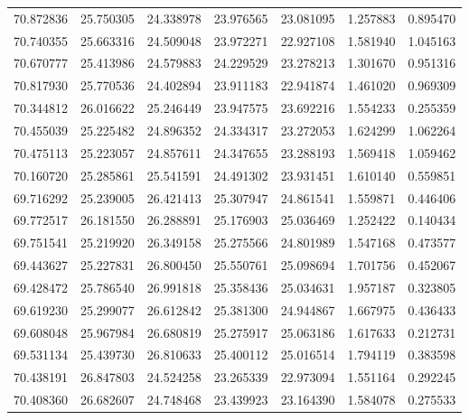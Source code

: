 \begin{tabular}{rrrrrrr}
 70.872836 &  25.750305 &         24.338978 &         23.976565 &         23.081095 &  1.257883 &  0.895470 \\
 70.740355 &  25.663316 &         24.509048 &         23.972271 &         22.927108 &  1.581940 &  1.045163 \\
 70.670777 &  25.413986 &         24.579883 &         24.229529 &         23.278213 &  1.301670 &  0.951316 \\
 70.817930 &  25.770536 &         24.402894 &         23.911183 &         22.941874 &  1.461020 &  0.969309 \\
 70.344812 &  26.016622 &         25.246449 &         23.947575 &         23.692216 &  1.554233 &  0.255359 \\
 70.455039 &  25.225482 &         24.896352 &         24.334317 &         23.272053 &  1.624299 &  1.062264 \\
 70.475113 &  25.223057 &         24.857611 &         24.347655 &         23.288193 &  1.569418 &  1.059462 \\
 70.160720 &  25.285861 &         25.541591 &         24.491302 &         23.931451 &  1.610140 &  0.559851 \\
 69.716292 &  25.239005 &         26.421413 &         25.307947 &         24.861541 &  1.559871 &  0.446406 \\
 69.772517 &  26.181550 &         26.288891 &         25.176903 &         25.036469 &  1.252422 &  0.140434 \\
 69.751541 &  25.219920 &         26.349158 &         25.275566 &         24.801989 &  1.547168 &  0.473577 \\
 69.443627 &  25.227831 &         26.800450 &         25.550761 &         25.098694 &  1.701756 &  0.452067 \\
 69.428472 &  25.786540 &         26.991818 &         25.358436 &         25.034631 &  1.957187 &  0.323805 \\
 69.619230 &  25.299077 &         26.612842 &         25.381300 &         24.944867 &  1.667975 &  0.436433 \\
 69.608048 &  25.967984 &         26.680819 &         25.275917 &         25.063186 &  1.617633 &  0.212731 \\
 69.531134 &  25.439730 &         26.810633 &         25.400112 &         25.016514 &  1.794119 &  0.383598 \\
 70.438191 &  26.847803 &         24.524258 &         23.265339 &         22.973094 &  1.551164 &  0.292245 \\
 70.408360 &  26.682607 &         24.748468 &         23.439923 &         23.164390 &  1.584078 &  0.275533 \\

\end{tabular}
